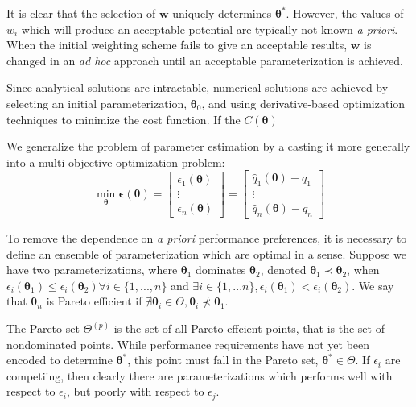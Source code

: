 It is clear that the selection of $\bm{w}$ uniquely determines $\bm{\theta}^*$.  However, the values of $w_i$ which will produce an acceptable potential are typically not known \emph{a priori}.  When the initial weighting scheme fails to give an acceptable results, $\bm{w}$ is changed in an \emph{ad hoc} approach until an acceptable parameterization is achieved.

Since analytical solutions are intractable, numerical solutions are achieved by selecting an initial parameterization, $\bm{\theta}_0$, and using derivative-based optimization techniques to minimize the cost function.  If the $C(\bm{\theta})$

We generalize the problem of parameter estimation by a casting it more generally into a multi-objective optimization problem:
\begin{equation}
    \min_{\bm{\theta}} \bm{\epsilon}(\bm{\theta})
        = \begin{bmatrix}
            \epsilon_1(\bm{\theta}) \\
            \vdots \\
            \epsilon_n(\bm{\theta})
          \end{bmatrix}
        = \begin{bmatrix}
            \hat{q}_1(\bm{\theta}) - q_1 \\
            \vdots \\
            \hat{q}_n(\bm{\theta}) - q_n
          \end{bmatrix}
\end{equation}

To remove the dependence on \emph{a priori} performance preferences, it is necessary to define an ensemble of parameterization which are optimal in a sense.  Suppose we have two parameterizations, where $\bm{\theta}_1$ dominates $\bm{\theta}_2$, denoted $\bm{\theta}_1 \prec \bm{\theta}_2$, when $\epsilon_i(\bm{\theta}_1) \leq \epsilon_i(\bm{\theta}_2) \forall i \in \{1,...,n\}$ and
$\exists i \in \{1,...n\}, \epsilon_i(\bm{\theta}_1) < \epsilon_i(\bm{\theta}_2)$.
We say that $\bm{\theta}_n$ is Pareto efficient if $\nexists \bm{\theta}_i \in \Theta, \bm{\theta}_i \nprec \bm{\theta}_1$.

The Pareto set $\Theta^{(p)}$ is the set of all Pareto effcient points, that is the set of nondominated points.  While performance requirements have not yet been encoded to determine $\bm{\theta}^*$, this point must fall in the Pareto set, $\bm{\theta}^* \in \Theta$.  If $\epsilon_i$ are competiing, then clearly there are parameterizations which performs well with respect to $\epsilon_i$, but poorly with respect to $\epsilon_j$.

